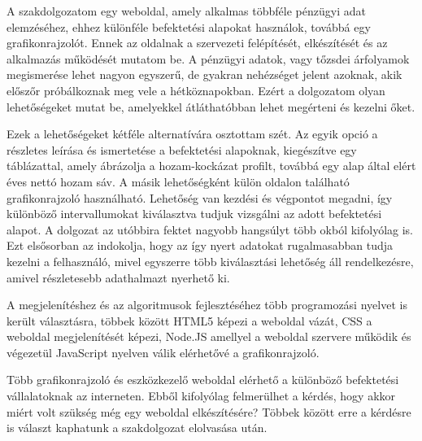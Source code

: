 
	A szakdolgozatom egy weboldal, amely alkalmas többféle pénzügyi adat elemzéséhez, ehhez különféle befektetési alapokat használok, továbbá egy grafikonrajzolót. Ennek az oldalnak a szervezeti felépítését, elkészítését és az alkalmazás működését mutatom be.
	A pénzügyi adatok, vagy tőzsdei árfolyamok megismerése lehet nagyon egyszerű, de gyakran nehézséget jelent azoknak, akik előszőr próbálkoznak meg vele a hétköznapokban. Ezért a dolgozatom olyan lehetőségeket mutat be, amelyekkel átláthatóbban lehet megérteni és kezelni őket.

	Ezek a lehetőségeket kétféle alternatívára osztottam szét. Az egyik opció a részletes leírása és ismertetése a befektetési alapoknak, kiegészítve egy táblázattal, amely ábrázolja a hozam-kockázat profilt, továbbá egy alap által elért éves nettó hozam sáv. A másik lehetőségként külön oldalon található grafikonrajzoló használható. Lehetőség van kezdési és végpontot megadni, így különböző intervallumokat kiválasztva tudjuk vizsgálni az adott befektetési alapot. A dolgozat az utóbbira fektet nagyobb hangsúlyt több okból kifolyólag is. Ezt elsősorban az indokolja, hogy az így nyert adatokat rugalmasabban tudja kezelni a felhasználó, mivel egyszerre több kiválasztási lehetőség áll rendelkezésre, amivel részletesebb adathalmazt nyerhető ki.

	A megjelenítéshez és az algoritmusok fejlesztéséhez több programozási nyelvet is került választásra, többek között HTML5 képezi a weboldal vázát, CSS a weboldal megjelenítését képezi, Node.JS amellyel a weboldal szervere működik és végezetül JavaScript nyelven válik elérhetővé a grafikonrajzoló.

	Több grafikonrajzoló és eszközkezelő weboldal elérhető a különböző befektetési vállalatoknak az interneten.  Ebből kifolyólag felmerülhet a kérdés, hogy akkor miért volt szükség még egy weboldal elkészítésére? Többek között erre a kérdésre is választ kaphatunk a szakdolgozat elolvasása után.
